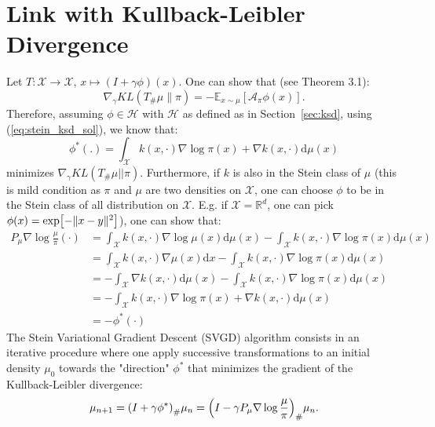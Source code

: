 \documentclass[runningheads,a4paper]{llncs}
\newcommand{\R}{\mathbb{R}}
\newcommand{\E}{\mathbb{E}}
\newcommand{\X}{\mathcal{X}}
\newcommand{\A}{\mathcal{A}}
\newcommand{\Hr}{\mathcal{H}}
\newcommand{\dr}{\mathrm{d}}
\DeclarePairedDelimiter{\pare}{(}{)}
\DeclarePairedDelimiter{\sq}{[}{]}
\begin{document}
\section{Link with Kullback-Leibler Divergence}
Let $T: \X \to \X$, $x \mapsto (I + \gamma \phi)(x)$. One can show that
(see \cite{https://doi.org/10.48550/arxiv.1608.04471} Theorem 3.1):
\begin{equation}
  \nabla_\gamma KL(T_\#\mu \| \pi) = -\E_{x \sim \mu}[\A_\pi \phi(x)].
  \label{eq:grad_kl}
\end{equation}
Therefore, assuming $\phi \in \Hr$ with $\Hr$ as defined as in Section~\ref{sec:ksd},
using (\ref{eq:stein_ksd_sol}), we know that:
\begin{equation}
  \phi^*(.) = \int_\X k(x, \cdot) \nabla \log \pi(x) + \nabla k(x, \cdot) \dr \mu(x)
\end{equation}
minimizes $\nabla_\gamma KL(T_\#\mu || \pi)$.
Furthermore, if $k$ is also in the Stein class of $\mu$ (this is mild condition as
$\pi$ and $\mu$ are two densities on $\X$, one can choose $\phi$ to be in the Stein class
of all distribution on $\X$. E.g. if $\X = \R^d$, one can pick $\phi(x) = \exp\sq*{-\| x - y \|^2}$),
one can show that:
\begin{equation}
  \begin{split}
    P_\mu \nabla \log \frac{\mu}{\pi} (\cdot) &=
      \int_\X k(x, \cdot) \nabla \log \mu(x) \dr \mu(x) - \int_\X k(x, \cdot) \nabla \log \pi (x) \dr \mu(x) \\
    &= \int_\X k(x, \cdot) \nabla \mu(x) \dr x - \int_\X k(x, \cdot) \nabla \log \pi (x) \dr \mu(x) \\
    &= - \int_\X \nabla k(x, \cdot) \dr \mu(x) - \int_\X k(x, \cdot) \nabla \log \pi (x) \dr \mu(x) \\
    &= - \int_\X k(x, \cdot) \nabla \log \pi (x) + \nabla k(x, \cdot) \dr \mu(x) \\
    &= -\phi^*(\cdot)
  \end{split}
\end{equation}
The Stein Variational Gradient Descent (SVGD) algorithm consists
in an iterative procedure where one apply successive transformations
to an initial density $\mu_0$ towards
the "direction" $\phi^*$ that minimizes the gradient of the Kullback-Leibler divergence:
\begin{equation}
  \mu_{n+1} = \pare*{ I + \gamma \phi^* }_\# \mu_n = \pare*{ I - \gamma P_\mu \nabla \log \frac{\mu}{\pi} }_\# \mu_n.
\end{equation}
\end{document}

